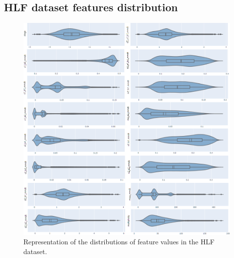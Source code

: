 \begin{appendices}

\chapter{HLF dataset features distribution}
\begin{figure}[hpt!]
  \centering
  \includegraphics[trim={0cm 0cm 0cm 0cm}, width=1.0\textwidth, center]{background/distributions.png}
  \caption{Representation of the distributions of feature values in the HLF dataset.}
  \label{fig:distributions-hlf}
\end{figure}



\end{appendices}
